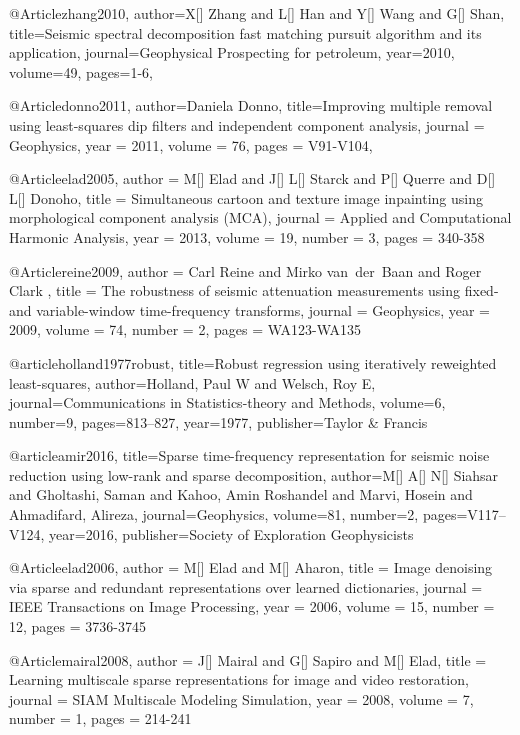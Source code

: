@Article{zhang2010,
  author={X[] Zhang and L[] Han and Y[] Wang and G[] Shan},
  title={Seismic spectral decomposition fast matching pursuit algorithm and its application},
  journal={Geophysical Prospecting for petroleum},
  year=2010,
  volume=49,
  pages={1-6},
}

@Article{donno2011,
  author={Daniela Donno},
  title={Improving multiple removal using least-squares dip filters
and independent component analysis},
  journal = 	 {Geophysics},
  year = 	 2011,
  volume =	 76,
  pages =	 {V91-V104},
}

@Article{elad2005,
  author = 	 {M[] Elad and J[] L[] Starck and P[] Querre and D[] L[] Donoho},
  title = 	 {Simultaneous cartoon and texture image inpainting using morphological component analysis (MCA)},
  journal = 	 {Applied and Computational Harmonic Analysis},
  year = 	 2013,
  volume = 	 19,
  number = 	 3,
  pages = 	 {340-358}}

@Article{reine2009,
  author = 	 {Carl Reine and Mirko van~der~Baan and Roger Clark },
  title = 	 {The robustness of seismic attenuation measurements using fixed- and variable-window time-frequency transforms},
  journal = 	 {Geophysics},
  year = 	 2009,
  volume = 	 74,
  number = 	 2,
  pages = 	 {WA123-WA135}}


@article{holland1977robust,
  title={Robust regression using iteratively reweighted least-squares},
  author={Holland, Paul W and Welsch, Roy E},
  journal={Communications in Statistics-theory and Methods},
  volume={6},
  number={9},
  pages={813--827},
  year={1977},
  publisher={Taylor \& Francis}
}

@article{amir2016,
  title={Sparse time-frequency representation for seismic noise reduction using low-rank and sparse decomposition},
  author={M[] A[] N[] Siahsar and Gholtashi, Saman and Kahoo, Amin Roshandel and Marvi, Hosein and Ahmadifard, Alireza},
  journal={Geophysics},
  volume={81},
  number={2},
  pages={V117--V124},
  year={2016},
  publisher={Society of Exploration Geophysicists}
}

@Article{elad2006,
  author = 	 {M[] Elad and M[] Aharon},
  title = 	 {Image denoising via sparse and redundant representations over learned dictionaries},
  journal = 	 {IEEE Transactions on Image Processing},
  year = 	 2006,
  volume = 	 15,
  number = 	 12,
  pages = 	 {3736-3745}}

@Article{mairal2008,
  author = 	 {J[] Mairal and G[] Sapiro and M[] Elad},
  title = 	 {Learning multiscale sparse representations for image and video restoration},
  journal = 	 {SIAM Multiscale Modeling Simulation},
  year = 	 2008,
  volume = 	 7,
  number = 	 1,
  pages = 	 {214-241}}


